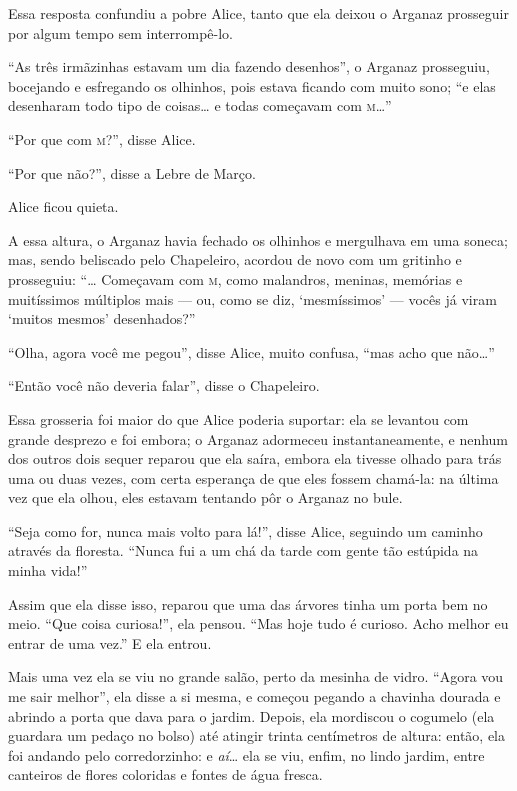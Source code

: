 Essa resposta confundiu a pobre Alice, tanto que ela deixou o Arganaz
prosseguir por algum tempo sem interrompê-lo.

``As três irmãzinhas estavam um dia fazendo desenhos'', o Arganaz
prosseguiu, bocejando e esfregando os olhinhos, pois estava ficando com
muito sono; ``e elas desenharam todo tipo de coisas\ldots{} e todas começavam
com \textsc{m}\ldots{}''

``Por que com \textsc{m}?'', disse Alice.

``Por que não?'', disse a Lebre de Março.

Alice ficou quieta.

A essa altura, o Arganaz havia fechado os olhinhos e mergulhava em uma
soneca; mas, sendo beliscado pelo Chapeleiro, acordou de novo com um
gritinho e prosseguiu: ``\ldots{} Começavam com \textsc{m}, como malandros, meninas,
memórias e muitíssimos múltiplos mais --- ou, como se diz, `mesmíssimos'
--- vocês já viram `muitos mesmos' desenhados?''

``Olha, agora você me pegou'', disse Alice, muito confusa, ``mas acho
que não\ldots{}''

``Então você não deveria falar'', disse o Chapeleiro.

Essa grosseria foi maior do que Alice poderia suportar: ela se levantou
com grande desprezo e foi embora; o Arganaz adormeceu instantaneamente,
e nenhum dos outros dois sequer reparou que ela saíra, embora ela tivesse
olhado para trás uma ou duas vezes, com certa esperança de que eles
fossem chamá-la: na última vez que ela olhou, eles estavam tentando pôr
o Arganaz no bule.

``Seja como for, nunca mais volto para lá!'', disse Alice, seguindo um
caminho através da floresta. ``Nunca fui a um chá da tarde com gente tão
estúpida na minha vida!''

Assim que ela disse isso, reparou que uma das árvores tinha um porta bem
no meio. ``Que coisa curiosa!'', ela pensou. ``Mas hoje tudo é curioso.
Acho melhor eu entrar de uma vez.'' E ela entrou.

Mais uma vez ela se viu no grande salão, perto da mesinha de vidro.
``Agora vou me sair melhor'', ela disse a si mesma, e começou pegando a
chavinha dourada e abrindo a porta que dava para o jardim. Depois, ela
mordiscou o cogumelo (ela guardara um pedaço no bolso) até atingir
trinta centímetros de altura: então, ela foi andando pelo corredorzinho:
e \emph{aí}\ldots{} ela se viu, enfim, no lindo jardim, entre canteiros de
flores coloridas e fontes de água fresca.

